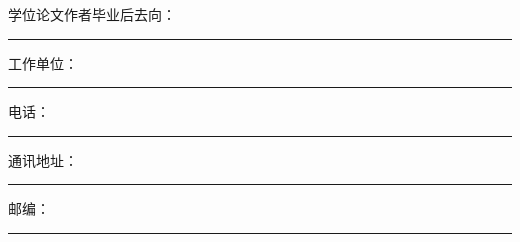 {\vspace{1.5cm}

\noindent 学位论文作者毕业后去向：\rule[-3pt]{8cm}{0.4pt}

\vspace{0.5cm}

\noindent
\begin{minipage}{0.48\textwidth}
  工作单位：\rule[-3pt]{5cm}{0.4pt}
\end{minipage}
\hfill
\begin{minipage}{0.3\textwidth}
  电话：\rule[-3pt]{2.5cm}{0.4pt}
\end{minipage}

\vspace{0.5cm}

\noindent
\begin{minipage}{0.48\textwidth}
  通讯地址：\rule[-3pt]{5cm}{0.4pt}
\end{minipage}
\hfill
\begin{minipage}{0.3\textwidth}
  邮编：\rule[-3pt]{2.5cm}{0.4pt}
\end{minipage}

}

\clearpage
